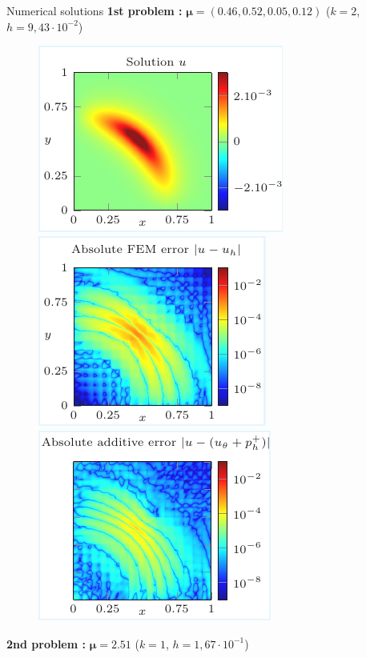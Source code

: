 \begin{frame}{Numerical solutions}
	\vspace{-3pt}
	\textbf{1st problem :} $\bm{\mu}=(0.46,0.52,0.05,0.12)$ \footnotesize \hfill ($k = 2$, $h = 9,43\cdot 10^{-2}$)\normalsize

	\vspace{-8pt}
	\begin{figure}[!ht] \centering
		\includegraphics[width=0.34\linewidth]{images/numeric/elliptic/plots/solution.pdf}		
		\includegraphics[width=0.31\linewidth]{images/numeric/elliptic/plots/error_FEM.pdf}	
		\includegraphics[width=0.31\linewidth]{images/numeric/elliptic/plots/error_ADD.pdf}	
	\end{figure}

	\vspace{-3pt}
	\textbf{2nd problem :} $\bm{\mu}=2.51 $ \footnotesize \hfill ($k = 1$, $h = 1,67\cdot 10^{-1}$)\normalsize


\end{frame}
